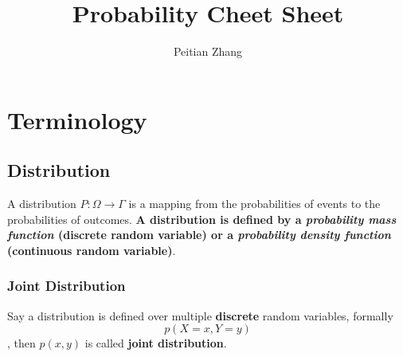 \documentclass{article}
\title{Probability Cheet Sheet}
\author{Peitian Zhang}
\begin{document}
\maketitle
\tableofcontents

\section{Terminology}
\subsection{Distribution}
A distribution $P: \Omega\rightarrow\Gamma$ is a mapping from the probabilities of events to the probabilities of outcomes. \textbf{A distribution is defined by a \emph{probability mass function} (discrete random variable) or a \emph{probability density function} (continuous random variable)}.

\subsubsection{Joint Distribution}
Say a distribution is defined over multiple \textbf{discrete} random variables, formally $$p(X=x,Y=y)$$, then $p(x,y)$ is called \textbf{joint distribution}.
\end{document}
